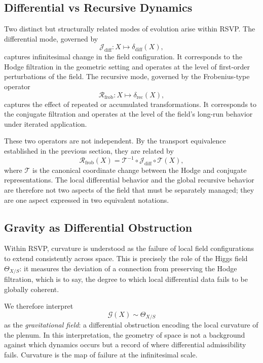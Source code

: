 \documentclass[12pt]{article}
\begin{document}
\subsection{Differential vs Recursive Dynamics}

Two distinct but structurally related modes of evolution arise within RSVP. The
differential mode, governed by
\[
\mathcal{J}_{\mathrm{diff}} : X \mapsto \delta_{\mathrm{diff}}(X),
\]
captures infinitesimal change in the field configuration. It corresponds to the Hodge
filtration in the geometric setting and operates at the level of first-order
perturbations of the field. The recursive mode, governed by the Frobenius-type
operator
\[
\mathcal{R}_{\mathrm{frob}} : X \mapsto \delta_{\mathrm{rec}}(X),
\]
captures the effect of repeated or accumulated transformations. It corresponds to the
conjugate filtration and operates at the level of the field's long-run behavior under
iterated application.

These two operators are not independent. By the transport equivalence established in
the previous section, they are related by
\[
\mathcal{R}_{\mathrm{frob}}(X) = \mathcal{T}^{-1} \circ \mathcal{J}_{\mathrm{diff}} \circ \mathcal{T}(X),
\]
where $\mathcal{T}$ is the canonical coordinate change between the Hodge and conjugate
representations. The local differential behavior and the global recursive behavior are
therefore not two aspects of the field that must be separately managed; they are one
aspect expressed in two equivalent notations.

\subsection{Gravity as Differential Obstruction}

Within RSVP, curvature is understood as the failure of local field configurations to
extend consistently across space. This is precisely the role of the Higgs field
$\Theta_{X/S}$: it measures the deviation of a connection from preserving the Hodge
filtration, which is to say, the degree to which local differential data fails to be
globally coherent.

We therefore interpret
\[
\mathcal{G}(X) \sim \Theta_{X/S}
\]
as the \emph{gravitational field}: a differential obstruction encoding the local
curvature of the plenum. In this interpretation, the geometry of space is not a
background against which dynamics occurs but a record of where differential
admissibility fails. Curvature is the map of failure at the infinitesimal scale.
\end{document}
